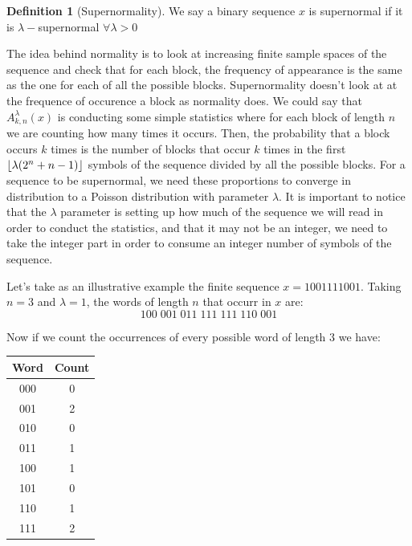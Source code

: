 \documentclass[11pt,a4paper]{tesis}
\theoremstyle{definition}
\newtheorem{definition}{Definition}[section]
\DeclarePairedDelimiter{\floor}{\lfloor}{\rfloor}
\begin{document}
\begin{definition}[Supernormality]
    We say a binary sequence $x$ is supernormal if it is $\lambda-$supernormal $\forall \lambda > 0$
\end{definition}



The idea behind normality is to look at increasing finite sample spaces of the sequence and check that for each block, the frequency of appearance is the same as the one for each of all the possible blocks.
Supernormality doesn't look at at the frequence of occurence a block as normality does. We could say that $A^\lambda_{k,n}(x)$ is conducting some simple statistics where for each block of length $n$ we are counting how many times it occurs. 
 Then, the probability that a block occurs $k$ times is the number of blocks that occur $k$ times in the first $\floor{\lambda(2^n + n - 1)}$ symbols of the sequence divided by all the possible blocks.
For a sequence to be supernormal, we need these proportions to converge in distribution to a Poisson distribution with parameter $\lambda$.
It is important to notice that the $\lambda$ parameter is setting up how much of the sequence we will read in order to conduct the statistics, and that it may not be an integer, we need to take the integer part in order to consume an integer number of symbols of the sequence.


Let's take as an illustrative example the finite sequence $x = 1001111001$. Taking $n=3$ and $\lambda = 1$, the words of length $n$ that occurr in $x$ are:
$$100 \; 001 \; 011\; 111\; 111\; 110\; 001$$

Now if we count the occurrences of every possible word of length $3$ we have:

\begin{center}
    \begin{tabular}{|c | c|} 
    \hline
    Word & Count \\ [0.5ex] 
    \hline
    000 & 0 \\ 
    \hline
    001 & 2 \\ 
    \hline
    010 & 0 \\ 
    \hline
    011 & 1 \\ 
    \hline
    100 & 1 \\ 
    \hline
    101 & 0 \\ 
    \hline
    110 & 1 \\ 
    \hline
    111 & 2 \\ 
    \hline
   \end{tabular}
\end{center}
\end{document}
